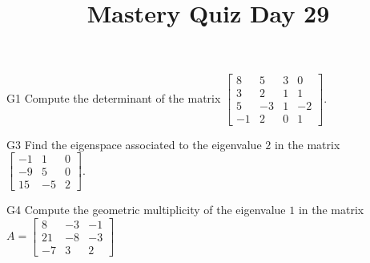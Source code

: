 \documentclass{sbgLAquiz}
\title{Mastery Quiz Day 29 }
\begin{document}
\begin{problem}{G1}
Compute the determinant of the matrix $\begin{bmatrix} 8 & 5 & 3 & 0 \\ 3 & 2 & 1 & 1 \\ 5 & -3 & 1 & -2 \\ -1 & 2 & 0 & 1\end{bmatrix} $.
\end{problem}

\begin{problem}{G3}
Find the eigenspace associated to the eigenvalue $2$ in the matrix $\begin{bmatrix} -1 & 1 & 0 \\ -9 & 5 & 0 \\ 15 & -5 & 2 \end{bmatrix}$.
\end{problem}
\newpage

\begin{problem}{G4}
Compute the geometric multiplicity of the eigenvalue $1$ in the matrix $A=\begin{bmatrix} 8 & -3 & -1 \\ 21 & -8 & -3 \\ -7 & 3  & 2 \end{bmatrix}$
\end{problem}
\end{document}
